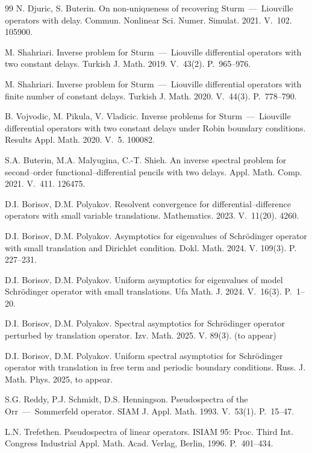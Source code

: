 \documentclass[10pt, a4paper]{article}
\theoremstyle{plain}
\theoremstyle{definition}
\numberwithin{equation}{section}
\begin{document}
\begin{thebibliography}{99}
N. Djuric, S. Buterin. On non-uniqueness of recovering Sturm~---~Liouville operators
with delay. Commun. Nonlinear Sci. Numer. Simulat. 2021. V.~102. 105900.

M. Shahriari. Inverse problem for Sturm~---~Liouville differential operators with two
constant delays. Turkish J. Math. 2019. V.~43(2). P.~965--976.

M. Shahriari. Inverse problem for Sturm~---~Liouville differential operators with finite
number of constant delays. Turkish J. Math. 2020. V.~44(3). P.~778--790.

B. Vojvodic, M. Pikula, V. Vladicic. Inverse problems for Sturm~---~Liouville differential
operators with two constant delays under Robin boundary conditions. Results Appl. Math.
2020. V.~5. 100082.

S.A. Buterin, M.A. Malyugina, C.-T. Shieh. An inverse spectral problem for
second--order functional--differential pencils with two delays. Appl. Math. Comp.
2021. V.~411. 126475.

D.I. Borisov, D.M. Polyakov. Resolvent convergence for differential--difference
operators with small variable translations. Mathematics. 2023. V.~11(20). 4260.

D.I. Borisov, D.M. Polyakov. Asymptotics for eigenvalues of Schr\"odinger operator with small translation and
Dirichlet condition. Dokl. Math. 2024. V. 109(3). P. 227--231.

D.I. Borisov, D.M. Polyakov. Uniform asymptotics for eigenvalues of model Schr\"odinger operator with small
translations. Ufa Math. J. 2024. V.~16(3). P.~1--20.

D.I. Borisov, D.M. Polyakov. Spectral asymptotics for Schr\"odinger operator perturbed by translation operator.
Izv. Math. 2025. V. 89(3). (to appear)


 D.I. Borisov, D.M. Polyakov. Uniform spectral asymptotics for Schr\"odinger operator with translation in free term and periodic boundary conditions. Russ. J. Math. Phys. 2025, to appear.

S.G. Reddy, P.J. Schmidt, D.S. Henningson. Pseudospectra of the Orr~---~Sommerfeld
operator. SIAM J. Appl. Math. 1993. V.~53(1). P.~15--47.

L.N. Trefethen. Pseudospectra of linear operators. ISIAM 95: Proc. Third Int.
Congress Industrial Appl. Math. Acad. Verlag, Berlin, 1996. P.~401--434.


\end{thebibliography}
\end{document}
